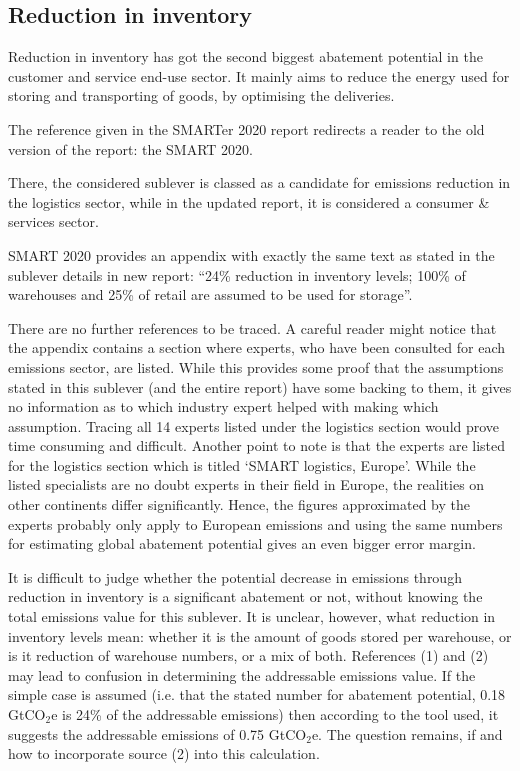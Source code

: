 \subsection{Reduction in inventory}

Reduction in inventory has got the second biggest abatement potential in the customer and service end-use sector. It mainly aims to reduce the energy used for storing and transporting of goods, by optimising the deliveries.

The reference given in the SMARTer 2020 report redirects a reader to the old version of the report: the SMART 2020. 

There, the considered sublever is classed as a candidate for emissions reduction in the logistics sector, while in the updated report, it is considered a consumer \& services sector.

SMART 2020 provides an appendix with exactly the same text as stated in the sublever details in new report: “24\% reduction in inventory levels; 100\% of warehouses and 25\% of retail are assumed to be used for storage”. 

There are no further references to be traced. A careful reader might notice that the appendix contains a section where experts, who have been consulted for each emissions sector, are listed. While this provides some proof that the assumptions stated in this sublever (and the entire report) have some backing to them, it gives no information as to which industry expert helped with making which assumption. Tracing all 14 experts listed under the logistics section would prove time consuming and difficult. 
Another point to note is that the experts are listed for the logistics section which is titled ‘SMART logistics, Europe’. While the listed specialists are no doubt experts in their field in Europe, the realities on other continents differ significantly. Hence, the figures approximated by the experts probably only apply to European emissions and using the same numbers for estimating global abatement potential gives an even bigger error margin.

It is difficult to judge whether the potential decrease in emissions through reduction in inventory is a significant abatement or not, without knowing the total emissions value for this sublever. It is unclear, however, what reduction in inventory levels mean: whether it is the amount of goods stored per warehouse, or is it reduction of warehouse numbers, or a mix of both. References (1) and (2) may lead to confusion in determining the addressable emissions value. If the simple case is assumed (i.e. that the stated number for abatement potential, 0.18 GtCO$_2$e is 24\% of the addressable emissions) then according to the tool used, it suggests the addressable emissions of 0.75 GtCO$_2$e. The question remains, if and how to incorporate source (2) into this calculation.

